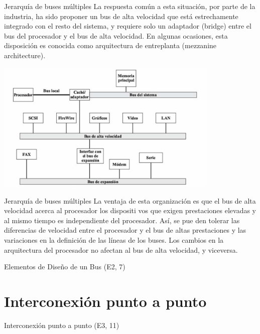 \documentclass[presentation]{beamer}
\begin{document}
\begin{frame}[label={sec:orgc003138}]{Jerarquía de buses múltiples}
La respuesta común a esta
situación, por parte de la industria, ha sido proponer un bus de alta velocidad que está estrechamente
integrado con el resto del sistema, y requiere solo un adaptador (bridge) entre el bus del procesador y
el bus de alta velocidad. En algunas ocasiones, esta disposición es conocida como arquitectura de
entreplanta (mezzanine architecture).

\begin{center}
\includegraphics[width=0.8\textwidth]{./Images/jerarquiaBuses2.jpeg}
\end{center}
\end{frame}

\begin{frame}[label={sec:orgd71a823}]{Jerarquía de buses múltiples}
La ventaja de esta organización es que el bus de alta velocidad acerca al procesador los dispositi
vos que exigen prestaciones elevadas y al mismo tiempo es independiente del procesador. Así, se pue
den tolerar las diferencias de velocidad entre el procesador y el bus de altas prestaciones y las
variaciones en la definición de las líneas de los buses. Los cambios en la arquitectura del procesador
no afectan al bus de alta velocidad, y viceversa.
\end{frame}
\begin{frame}[label={sec:org0b3a5bf}]{Elementos de Diseño de un Bus (E2, 7)}
\end{frame}
\section{Interconexión punto a punto}
\label{sec:org35c00fc}
\begin{frame}[label={sec:org8d74865}]{Interconexión punto a punto (E3, 11)}
\end{frame}
\end{document}
